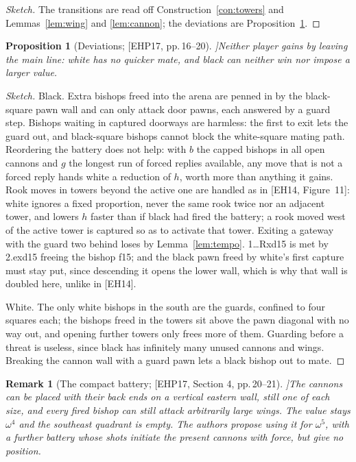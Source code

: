 \documentclass[10pt]{article}
\theoremstyle{notes}
\newtheorem{proposition}[theorem]{Proposition}
\newtheorem{remark}[theorem]{Remark}
\newenvironment{sketch}{\begin{proof}[Sketch]\renewcommand{\qedsymbol}{}}{\end{proof}}
\newcommand{\EHP}[1]{[EHP17, #1]}
\begin{document}
\begin{sketch}
The transitions are read off Construction~\ref{con:towers} and Lemmas~\ref{lem:wing} and
\ref{lem:cannon}; the deviations are Proposition~\ref{prop:deviations}.
\end{sketch}

\begin{proposition}[Deviations; \EHP{pp.\,16--20}]\label{prop:deviations}
Neither player gains by leaving the main line: white has no quicker mate, and black can neither win nor
impose a larger value.
\end{proposition}

\begin{sketch}
Black. Extra bishops freed into the arena are penned in by the black-square pawn wall and can only attack
door pawns, each answered by a guard step. Bishops waiting in captured doorways are harmless: the first to
exit lets the guard out, and black-square bishops cannot block the white-square mating path. Reordering the
battery does not help: with $b$ the capped bishops in all open cannons and $g$ the longest run of forced
replies available, any move that is not a forced reply hands white a reduction of $h$, worth more than
anything it gains. Rook moves in towers beyond the active one are handled as in [EH14, Figure~11]: white
ignores a fixed proportion, never the same rook twice nor an adjacent tower, and lowers $h$ faster than if
black had fired the battery; a rook moved west of the active tower is captured so as to activate that tower.
Exiting a gateway with the guard two behind loses by Lemma~\ref{lem:tempo}. 1\ldots Rxd15 is met by
2.exd15 freeing the bishop f15; and the black pawn freed by white's first capture must stay put, since
descending it opens the lower wall, which is why that wall is doubled here, unlike in [EH14].

White. The only white bishops in the south are the guards, confined to four squares each; the bishops freed
in the towers sit above the pawn diagonal with no way out, and opening further towers only frees more of them.
Guarding before a threat is useless, since black has infinitely many unused cannons and wings. Breaking the
cannon wall with a guard pawn lets a black bishop out to mate.
\end{sketch}

\begin{remark}[The compact battery; \EHP{Section 4, pp.\,20--21}]\label{rem:compact}
The cannons can be placed with their back ends on a vertical eastern wall, still one of each size, and
every fired bishop can still attack arbitrarily large wings. The value stays $\omega^4$ and the southeast
quadrant is empty. The authors propose using it for $\omega^5$, with a further battery whose shots initiate
the present cannons with force, but give no position.
\end{remark}
\end{document}
